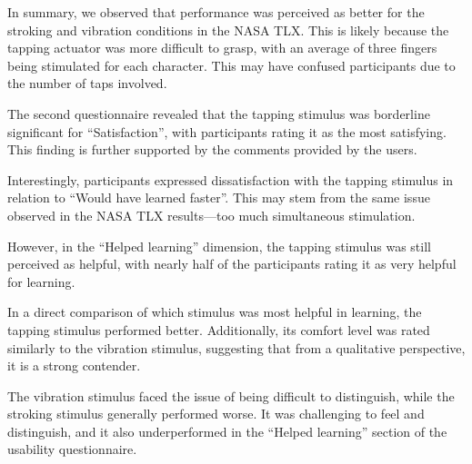 In summary, we observed that performance was perceived as better for the stroking and vibration conditions in the NASA TLX. This is likely because the tapping actuator was more difficult to grasp, with an average of three fingers being stimulated for each character. This may have confused participants due to the number of taps involved.

The second questionnaire revealed that the tapping stimulus was borderline significant for \enquote{Satisfaction}, with participants rating it as the most satisfying. This finding is further supported by the comments provided by the users.

Interestingly, participants expressed dissatisfaction with the tapping stimulus in relation to \enquote{Would have learned faster}. This may stem from the same issue observed in the NASA TLX results—too much simultaneous stimulation.

However, in the \enquote{Helped learning} dimension, the tapping stimulus was still perceived as helpful, with nearly half of the participants rating it as very helpful for learning.

In a direct comparison of which stimulus was most helpful in learning, the tapping stimulus performed better. Additionally, its comfort level was rated similarly to the vibration stimulus, suggesting that from a qualitative perspective, it is a strong contender.

The vibration stimulus faced the issue of being difficult to distinguish, while the stroking stimulus generally performed worse. It was challenging to feel and distinguish, and it also underperformed in the \enquote{Helped learning} section of the usability questionnaire.







